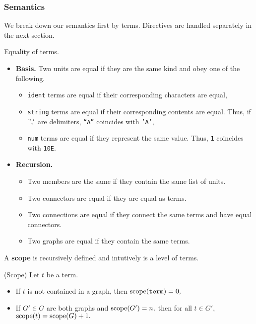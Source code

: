\subsubsection*{Semantics}
We break down our semantics first by terms. Directives are handled separately in the next section.
\begin{definition}
Equality of terms.
\begin{itemize}
  \item \textbf{Basis.} Two units are equal if they are the same kind and obey one of the following.
	\begin{itemize}
	  \item \texttt{ident} terms are equal if their corresponding characters are equal,
      \item \texttt{string} terms are equal if their corresponding contents are equal. Thus, if $", '$ are delimiters, \texttt{``A''} coincides with \texttt{'A'},
	  \item \texttt{num} terms are equal if they represent the same value. Thus, \texttt{1} coincides with \texttt{10E}.
	\end{itemize}
  \item \textbf{Recursion.}
        \begin{itemize}
        \item Two members are the same if they contain the same list of units. %
        \item Two connectors are equal if they are equal as terms. %
 		  \item Two connections are equal if they connect the same terms and have equal connectors.
		  \item Two graphs are equal if they contain the same terms.
	\end{itemize}
\end{itemize}
\end{definition}
A \textbf{scope} is recursively defined and intutively is a level of terms.
\begin{definition} (Scope)
 Let $t$ be a term.
  \begin{itemize}
	\item If $t$ is not contained in a graph, then $\textrm{scope}(\texttt{term}) = 0,$
	\item If $G' \in G$ are both graphs and $\textrm{scope}(G') = n,$ then for all $t \in G',$ $\textrm{scope}(t) = \textrm{scope}(G) + 1.$
\end{itemize}
\end{definition}
